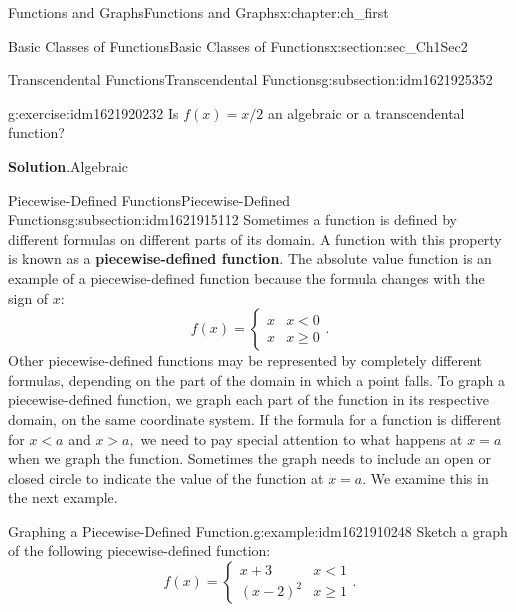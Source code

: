 \documentclass[oneside,10pt,]{book}
\newcommand{\blocktitlefont}{\relax}
\newcommand{\terminology}[1]{\textbf{#1}}
\numberwithin{equation}{section}
\newcommand{\lt}{<}
\newcommand{\gt}{>}
\newcommand{\amp}{&}
\begin{document}
\begin{chapterptx}{Functions and Graphs}{}{Functions and Graphs}{}{}{x:chapter:ch_first}
\begin{sectionptx}{Basic Classes of Functions}{}{Basic Classes of Functions}{}{}{x:section:sec_Ch1Sec2}
\begin{subsectionptx}{Transcendental Functions}{}{Transcendental Functions}{}{}{g:subsection:idm1621925352}
\begin{inlineexercise}{}{g:exercise:idm1621920232}%
Is \(f(x)=x / 2 \) an algebraic or a transcendental function?%
\par\smallskip%
\noindent\textbf{\blocktitlefont Solution}.\hypertarget{g:solution:idm1621914216}{}\quad{}Algebraic%
\end{inlineexercise}%
\end{subsectionptx}
%
%
\typeout{************************************************}
\typeout{************************************************}
%
\begin{subsectionptx}{Piecewise-Defined Functions}{}{Piecewise-Defined Functions}{}{}{g:subsection:idm1621915112}
Sometimes a function is defined by different formulas on different parts of its domain. A function with this property is known as a \terminology{piecewise-defined function}. The absolute value function is an example of a piecewise-defined function because the formula changes with the sign of \(x\):%
%
\begin{equation*}
f(x)=\begin{cases}x \amp x \lt 0 \\ x \amp x \geq 0\end{cases}\text{.}
\end{equation*}
Other piecewise-defined functions may be represented by completely different formulas, depending on the part of the domain in which a point falls. To graph a piecewise-defined function, we graph each part of the function in its respective domain, on the same coordinate system. If the formula for a function is different for \(x\lt a\) and \(x\gt a,\) we need to pay special attention to what happens at \(x=a\) when we graph the function. Sometimes the graph needs to include an open or closed circle to indicate the value of the function at \(x=a.\) We examine this in the next example.%
\begin{example}{Graphing a Piecewise-Defined Function.}{g:example:idm1621910248}%
Sketch a graph of the following piecewise-defined function:%
%
\begin{equation*}
f(x)=\begin{cases}x+ 3 \amp x\lt  1 \\(x- 2 )^2 \amp x\geq  1 \end{cases}.
\end{equation*}
\par\smallskip%

\end{example}
\end{subsectionptx}
\end{sectionptx}
\end{chapterptx}
\end{document}
